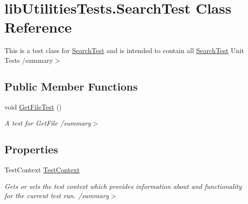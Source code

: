 \hypertarget{classlib_utilities_tests_1_1_search_test}{\section{lib\+Utilities\+Tests.\+Search\+Test Class Reference}
\label{classlib_utilities_tests_1_1_search_test}
}


This is a test class for \hyperlink{classlib_utilities_tests_1_1_search_test}{Search\+Test} and is intended to contain all \hyperlink{classlib_utilities_tests_1_1_search_test}{Search\+Test} Unit Tests /summary$>$  


\subsection*{Public Member Functions}
\begin{DoxyCompactItemize}
\item 
\hypertarget{classlib_utilities_tests_1_1_search_test_a61508d18ef13290d6d41868451fed02b}{void \hyperlink{classlib_utilities_tests_1_1_search_test_a61508d18ef13290d6d41868451fed02b}{Get\+File\+Test} ()}\label{classlib_utilities_tests_1_1_search_test_a61508d18ef13290d6d41868451fed02b}

\begin{DoxyCompactList}\small\item\em A test for Get\+File /summary$>$ \end{DoxyCompactList}\end{DoxyCompactItemize}
\subsection*{Properties}
\begin{DoxyCompactItemize}
\item 
\hypertarget{classlib_utilities_tests_1_1_search_test_ad3196cbcf1e757dda49297d7bed05e4c}{Test\+Context \hyperlink{classlib_utilities_tests_1_1_search_test_ad3196cbcf1e757dda49297d7bed05e4c}{Test\+Context}}\label{classlib_utilities_tests_1_1_search_test_ad3196cbcf1e757dda49297d7bed05e4c}

\begin{DoxyCompactList}\small\item\em Gets or sets the test context which provides information about and functionality for the current test run. /summary$>$ \end{DoxyCompactList}\end{DoxyCompactItemize}


